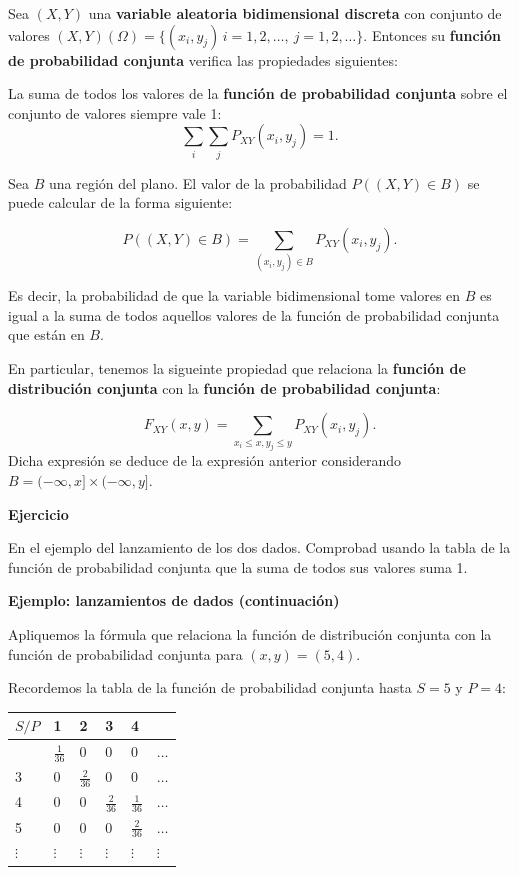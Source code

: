\documentclass[
  letterpaper,
  DIV=11,
  numbers=noendperiod]{scrreprt}
\begin{document}
Sea \((X,Y)\) una \textbf{variable aleatoria bidimensional discreta} con
conjunto de valores
\((X,Y)(\Omega)=\{(x_i,y_j)\, i=1,2,\ldots,\ j=1,2,\ldots\}\). Entonces
su \textbf{función de probabilidad conjunta} verifica las propiedades
siguientes:

La suma de todos los valores de la \textbf{función de probabilidad
conjunta} sobre el conjunto de valores siempre vale 1:
\[\sum_{i}\sum_j P_{XY}(x_i,y_j)=1.\]

Sea \(B\) una región del plano. El valor de la probabilidad
\(P((X,Y)\in B)\) se puede calcular de la forma siguiente:

\[
P((X,Y)\in B) =\sum_{(x_i,y_j)\in B} P_{XY}(x_i,y_j).
\]

Es decir, la probabilidad de que la variable bidimensional tome valores
en \(B\) es igual a la suma de todos aquellos valores de la función de
probabilidad conjunta que están en \(B\).

En particular, tenemos la sigueinte propiedad que relaciona la
\textbf{función de distribución conjunta} con la \textbf{función de
probabilidad conjunta}:

\[
F_{XY}(x,y)=\sum_{x_i\leq x, y_j\leq y} P_{XY}(x_i,y_j).
\] Dicha expresión se deduce de la expresión anterior considerando
\(B=(-\infty,x]\times (-\infty,y]\).

\textbf{Ejercicio}

En el ejemplo del lanzamiento de los dos dados. Comprobad usando la
tabla de la función de probabilidad conjunta que la suma de todos sus
valores suma 1.

\textbf{Ejemplo: lanzamientos de dados (continuación)}

Apliquemos la fórmula que relaciona la función de distribución conjunta
con la función de probabilidad conjunta para \((x,y)=(5,4)\).

Recordemos la tabla de la función de probabilidad conjunta hasta \(S=5\)
y \(P=4\):

\begin{longtable}[]{@{}llllll@{}}
\toprule\noalign{}
\(S/P\) & 1 & 2 & 3 & 4 & \\
\midrule\noalign{}
\endhead
\bottomrule\noalign{}
\endlastfoot
2 & \(\frac{1}{36}\) & 0 & 0 & 0 & \(\ldots\) \\
3 & 0 & \(\frac{2}{36}\) & 0 & 0 & \(\ldots\) \\
4 & 0 & 0 & \(\frac{2}{36}\) & \(\frac{1}{36}\) & \(\ldots\) \\
5 & 0 & 0 & 0 & \(\frac{2}{36}\) & \(\ldots\) \\
\(\vdots\) & \(\vdots\) & \(\vdots\) & \(\vdots\) & \(\vdots\) &
\(\vdots\) \\
\end{longtable}
\end{document}
